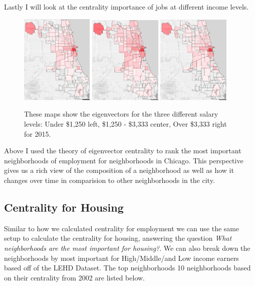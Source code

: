 \documentclass{article}
\theoremstyle{definition}
\theoremstyle{remark}
\begin{document}
Lastly I will look at the centrality importance of jobs at different income levels.

\begin{figure}[H]
    \centering
    \includegraphics[width=0.31\textwidth]{Jobs-SE001-2015}
    \includegraphics[width=0.31\textwidth]{Jobs-SE002-2015}
    \includegraphics[width=0.31\textwidth]{Jobs-SE003-2015}
    \caption{These maps show the eigenvectors for the three different salary levels: Under \$1,250 left, \$1,250 - \$3,333 center, Over \$3,333 right for 2015.}
    \label{fig:Jobs-S000-2008}
\end{figure}

Above I used the theory of eigenvector centrality to rank the most important neighborhoods of employment for neighborhoods in Chicago.  This perspective gives us a rich view of the composition of a neighborhood as well as how it changes over time in comparision to other neighborhoods in the city.

\subsection{Centrality for Housing}
Similar to how we calculated centrality for employment we can use the same setup to calculate the centrality for housing, answering the question \textit{What neighborhoods are the most important for housing?}.  We can also break down the neighborhoods by most important for High/Middle/and Low income earners based off of the LEHD Dataset.  The top neighborhoods 10 neighborhoods based on their centrality from 2002 are listed below. \\
\end{document}
